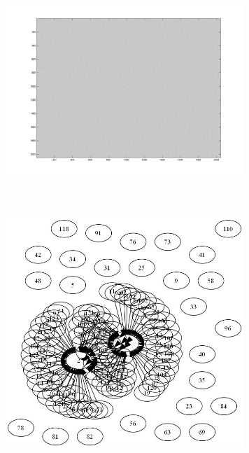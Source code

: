 \includegraphics[width=9.0cm,height=9.0cm]{images/GraphTheory/WishartMatrixforMikey.jpg}
\includegraphics[width=9.0cm,height=9.0cm]{images/GraphTheory/_GtDout.jpg}
